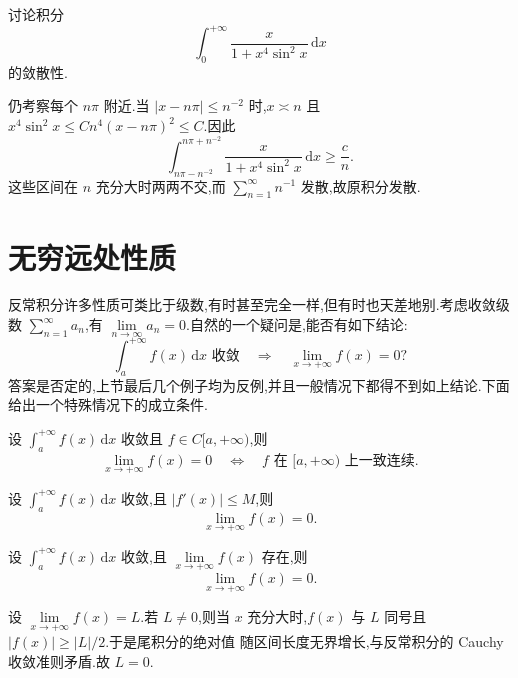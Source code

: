 \begin{example}[\markstar]
  讨论积分
  \[
    \int_0^{+\infty}\dfrac{x}{1+x^4\sin^2x}\,\mathrm{d}x
  \]
  的敛散性.
\end{example}
\exampleblank

\begin{solution}
  仍考察每个 $n\pi$ 附近.当
  $|x-n\pi|\leq n^{-2}$ 时,$x\asymp n$ 且
  $x^4\sin^2x\leq Cn^4(x-n\pi)^2\leq C$.因此
  \[
    \int_{n\pi-n^{-2}}^{n\pi+n^{-2}}
    \dfrac{x}{1+x^4\sin^2x}\,\mathrm{d}x
    \geq\dfrac{c}{n}.
  \]
  这些区间在 $n$ 充分大时两两不交,而
  $\displaystyle\sum\limits_{n=1}^{\infty}n^{-1}$ 发散,故原积分发散.
\end{solution}


\newpage

\section{无穷远处性质}

反常积分许多性质可类比于级数,有时甚至完全一样,但有时也天差地别.考虑收敛级数 $\displaystyle\sum\limits_{n=1}^{\infty}a_n$,有 $\displaystyle\lim\limits_{n\to\infty}a_n=0$.自然的一个疑问是,能否有如下结论:
\[
  \int_a^{+\infty}f(x)\,\mathrm{d}x\text{ 收敛}
  \quad\Longrightarrow\quad
  \lim\limits_{x\to+\infty}f(x)=0?
\]
答案是否定的,上节最后几个例子均为反例,并且一般情况下都得不到如上结论.下面给出一个特殊情况下的成立条件.

\begin{proposition}[\markstar]
  设 $\displaystyle\int_a^{+\infty}f(x)\,\mathrm{d}x$ 收敛且 $f\in C\lbrack a,+\infty)$,则
  \[
    \lim\limits_{x\to+\infty}f(x)=0
    \quad\Longleftrightarrow\quad
    f\text{ 在 }\lbrack a,+\infty)\text{ 上一致连续}.
  \]
\end{proposition}

\begin{corollary}[\markstar]
  设 $\displaystyle\int_a^{+\infty}f(x)\,\mathrm{d}x$ 收敛,且 $|f'(x)|\leq M$,则
  \[
    \lim\limits_{x\to+\infty}f(x)=0.
  \]
\end{corollary}

\begin{example}
  设 $\displaystyle\int_a^{+\infty}f(x)\,\mathrm{d}x$ 收敛,且 $\displaystyle\lim\limits_{x\to+\infty}f(x)$ 存在,则
  \[
    \lim\limits_{x\to+\infty}f(x)=0.
  \]
\end{example}
\exampleblank

\begin{solution}
  设 $\displaystyle\lim\limits_{x\to+\infty}f(x)=L$.若 $L\neq0$,则当 $x$
  充分大时,$f(x)$ 与 $L$ 同号且 $|f(x)|\geq|L|/2$.于是尾积分的绝对值
  随区间长度无界增长,与反常积分的 Cauchy 收敛准则矛盾.故 $L=0$.
\end{solution}

